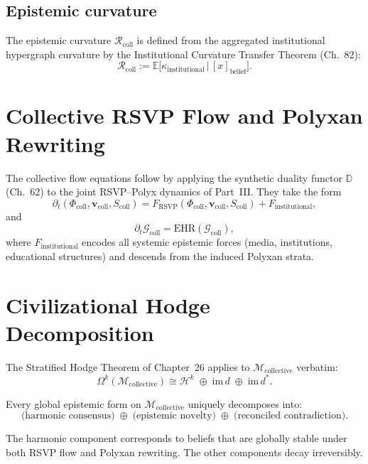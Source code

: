\subsection{Epistemic curvature}
The epistemic curvature $\mathcal{R}_{\mathrm{coll}}$ is defined from
the aggregated institutional hypergraph curvature by the
Institutional Curvature Transfer Theorem (Ch.~82):
\[
  \mathcal{R}_{\mathrm{coll}}
  := \mathbb{E}\big[\kappa_{\mathrm{institutional}}\,
     \big|\,[x]_{\mathrm{belief}}\big].
\]


\section{Collective RSVP Flow and Polyxan Rewriting}

The collective flow equations follow by applying the synthetic duality
functor $\mathbb{D}$ (Ch.~62) to the joint RSVP--Polyx dynamics
of Part~III.
They take the form
\[
  \partial_t (\Phi_{\mathrm{coll}},\mathbf{v}_{\mathrm{coll}},S_{\mathrm{coll}})
  = F_{\mathrm{RSVP}}(\Phi_{\mathrm{coll}},\mathbf{v}_{\mathrm{coll}},S_{\mathrm{coll}})
    + F_{\mathrm{institutional}},
\]
and
\[
  \partial_t \mathcal{G}_{\mathrm{coll}}
  = \mathrm{EHR}(\mathcal{G}_{\mathrm{coll}}),
\]
where $F_{\mathrm{institutional}}$ encodes all systemic epistemic
forces (media, institutions, educational structures) and descends from
the induced Polyxan strata.


\section{Civilizational Hodge Decomposition}

The Stratified Hodge Theorem of Chapter~26 applies to
$\mathcal{M}_{\mathrm{collective}}$ verbatim:
\[
  \Omega^k(\mathcal{M}_{\mathrm{collective}})
  \cong
  \mathcal{H}^k
  \;\oplus\;
  \mathrm{im}\, d
  \;\oplus\;
  \mathrm{im}\, d^\ast.
\]

\begin{theorem}
Every global epistemic form on $\mathcal{M}_{\mathrm{collective}}$ uniquely
decomposes into:
\[
  \text{(harmonic consensus)}
  \;\oplus\;
  \text{(epistemic novelty)}
  \;\oplus\;
  \text{(reconciled contradiction)}.
\]
\end{theorem}

The harmonic component corresponds to beliefs that are globally
stable under both RSVP flow and Polyxan rewriting.
The other components decay irreversibly.


